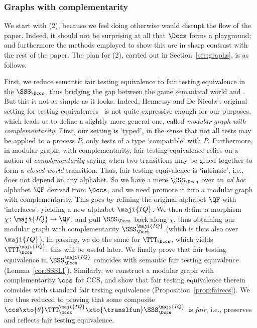 \documentclass{LMCS}
\renewcommand{\QFI}{\maji{IQ}}
\renewcommand{\LLL}{\QFI}
\renewcommand{\SSSL}{\SSS^{\LLL}}
\renewcommand{\TTTL}{\TTT^{\LLL}}
\theoremstyle{plain}\newtheorem{satz}[thm]{Satz}
\begin{document}
\subsubsection{Graphs with complementarity}
We start with (2), because we feel doing otherwise would disrupt the
flow of the paper. Indeed, it should not be surprising at all that
$\Dccs$ forms a playground; and furthermore the methods employed to
show this are in sharp contrast with the rest of the paper.  The plan
for (2), carried out in Section~\ref{sec:graphs}, is as follows.

First, we reduce semantic fair testing equivalence to fair testing
equivalence in the \lts{} $\SSS_{\Dccs}$, thus bridging the gap
between the game semantical world and \ltss{}. But this is not as
simple as it looks.  Indeed, Hennessy and De Nicola's original setting
for testing equivalences~\citep{DBLP:journals/tcs/NicolaH84} is not
quite expressive enough for our purposes, which leads us to define a
slightly more general one, called \emph{modular graph with
  complementarity}.  First, our setting is `typed', in the sense that
not all tests may be applied to a process $P$, only tests of a type
`compatible' with $P$. Furthermore, in modular graphs with
complementarity, fair testing equivalence relies on a notion of
\emph{complementarity} saying when two transitions may be glued
together to form a \emph{closed-world} transition.  Thus, fair testing
equivalence is `intrinsic', i.e., does not depend on any alphabet.  So
we have a mere \lts{} $\SSS_{\Dccs}$ over an \emph{ad hoc} alphabet
$\QF$ derived from $\Dccs$, and we need promote it into a modular
graph with complementarity.  This goes by refining the original
alphabet $\QF$ with `interfaces', yielding a new alphabet $\QFI$. We
then define a morphism $\chi \colon \QFI \to \QF$, and pull 
$\SSS_{\Dccs}$ back along $\chi$, thus obtaining our modular graph with
complementarity $\SSSL_{\Dccs}$ (which is thus also \anlts{} over
$\QFI$). In passing, we do the same for $\TTT_{\Dccs}$, which yields
$\TTTL_{\Dccs}$: this will be useful later.  We finally prove that
fair testing equivalence in $\SSSL_{\Dccs}$ coincides with semantic
fair testing equivalence (Lemma~\ref{cor:SSSLI}).  Similarly, we
construct a modular graph with complementarity $\ccs$ for CCS, and
show that fair testing equivalence therein coincides with standard
fair testing equivalence (Proposition~\ref{prop:fairccs}).  We are
thus reduced to proving that some composite $\ccs \xto{\theta}
\TTTL_{\Dccs} \xto{\translfun} \SSSL_{\Dccs}$ is \emph{fair}, i.e.,
preserves and reflects fair testing equivalence.
\end{document}
